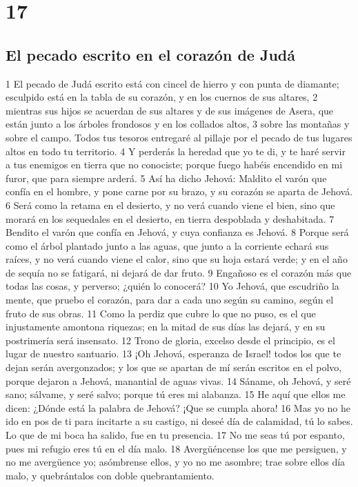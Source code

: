 \chapter{17}

\section*{El pecado escrito en el corazón de Judá}

1 El pecado de Judá escrito está con cincel de hierro y con punta de diamante; esculpido está en la tabla de su corazón, y en los cuernos de sus altares,
2 mientras sus hijos se acuerdan de sus altares y de sus imágenes de Asera, que están junto a los árboles frondosos y en los collados altos,
3 sobre las montañas y sobre el campo. Todos tus tesoros entregaré al pillaje por el pecado de tus lugares altos en todo tu territorio.
4 Y perderás la heredad que yo te di, y te haré servir a tus enemigos en tierra que no conociste; porque fuego habéis encendido en mi furor, que para siempre arderá.
5 Así ha dicho Jehová: Maldito el varón que confía en el hombre, y pone carne por su brazo, y su corazón se aparta de Jehová.
6 Será como la retama en el desierto, y no verá cuando viene el bien, sino que morará en los sequedales en el desierto, en tierra despoblada y deshabitada.
7 Bendito el varón que confía en Jehová, y cuya confianza es Jehová.
8 Porque será como el árbol plantado junto a las aguas, que junto a la corriente echará sus raíces, y no verá cuando viene el calor, sino que su hoja estará verde; y en el año de sequía no se fatigará, ni dejará de dar fruto.
9 Engañoso es el corazón más que todas las cosas, y perverso; ¿quién lo conocerá?
10 Yo Jehová, que escudriño la mente, que pruebo el corazón, para dar a cada uno según su camino, según el fruto de sus obras.
11 Como la perdiz que cubre lo que no puso, es el que injustamente amontona riquezas; en la mitad de sus días las dejará, y en su postrimería será insensato.
12 Trono de gloria, excelso desde el principio, es el lugar de nuestro santuario.
13 ¡Oh Jehová, esperanza de Israel! todos los que te dejan serán avergonzados; y los que se apartan de mí serán escritos en el polvo, porque dejaron a Jehová, manantial de aguas vivas.
14 Sáname, oh Jehová, y seré sano; sálvame, y seré salvo; porque tú eres mi alabanza.
15 He aquí que ellos me dicen: ¿Dónde está la palabra de Jehová? ¡Que se cumpla ahora!
16 Mas yo no he ido en pos de ti para incitarte a su castigo, ni deseé día de calamidad, tú lo sabes. Lo que de mi boca ha salido, fue en tu presencia.
17 No me seas tú por espanto, pues mi refugio eres tú en el día malo.
18 Avergüéncense los que me persiguen, y no me avergüence yo; asómbrense ellos, y yo no me asombre; trae sobre ellos día malo, y quebrántalos con doble quebrantamiento.

